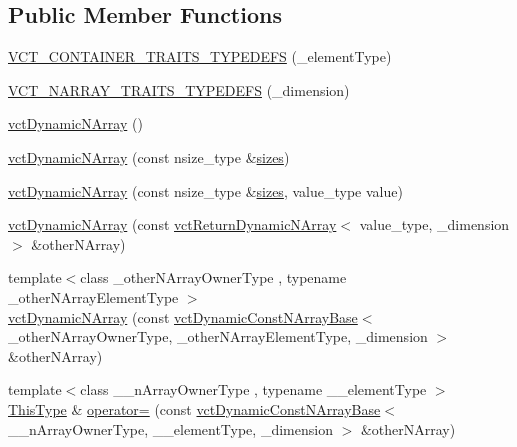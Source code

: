 \subsection*{Public Member Functions}
\begin{DoxyCompactItemize}
\item 
\hyperlink{classvct_dynamic_n_array_a4af562b1f07469aee8e1814229c25f43}{V\-C\-T\-\_\-\-C\-O\-N\-T\-A\-I\-N\-E\-R\-\_\-\-T\-R\-A\-I\-T\-S\-\_\-\-T\-Y\-P\-E\-D\-E\-F\-S} (\-\_\-element\-Type)
\item 
\hyperlink{classvct_dynamic_n_array_a8b81b0f17ae6ab1003db3caec7975a69}{V\-C\-T\-\_\-\-N\-A\-R\-R\-A\-Y\-\_\-\-T\-R\-A\-I\-T\-S\-\_\-\-T\-Y\-P\-E\-D\-E\-F\-S} (\-\_\-dimension)
\item 
\hyperlink{classvct_dynamic_n_array_a060ec7a5353aa03ec193408550e4db87}{vct\-Dynamic\-N\-Array} ()
\item 
\hyperlink{classvct_dynamic_n_array_aafd77c7531ef00396fdfb20405fc4661}{vct\-Dynamic\-N\-Array} (const nsize\-\_\-type \&\hyperlink{classvct_dynamic_const_n_array_base_aa86793343d80325ba5671bc24a2e0e8f}{sizes})
\item 
\hyperlink{classvct_dynamic_n_array_a3434a9ecc21191540f8a7e97c3bb1583}{vct\-Dynamic\-N\-Array} (const nsize\-\_\-type \&\hyperlink{classvct_dynamic_const_n_array_base_aa86793343d80325ba5671bc24a2e0e8f}{sizes}, value\-\_\-type value)
\item 
\hyperlink{classvct_dynamic_n_array_ad75002957a8c3602e333ba455f4676a5}{vct\-Dynamic\-N\-Array} (const \hyperlink{classvct_return_dynamic_n_array}{vct\-Return\-Dynamic\-N\-Array}$<$ value\-\_\-type, \-\_\-dimension $>$ \&other\-N\-Array)
\item 
{\footnotesize template$<$class \-\_\-other\-N\-Array\-Owner\-Type , typename \-\_\-other\-N\-Array\-Element\-Type $>$ }\\\hyperlink{classvct_dynamic_n_array_a87edcc1f96efe22934bdfa855aecebdb}{vct\-Dynamic\-N\-Array} (const \hyperlink{classvct_dynamic_const_n_array_base}{vct\-Dynamic\-Const\-N\-Array\-Base}$<$ \-\_\-other\-N\-Array\-Owner\-Type, \-\_\-other\-N\-Array\-Element\-Type, \-\_\-dimension $>$ \&other\-N\-Array)
\item 
{\footnotesize template$<$class \-\_\-\-\_\-n\-Array\-Owner\-Type , typename \-\_\-\-\_\-element\-Type $>$ }\\\hyperlink{classvct_dynamic_const_n_array_base_a5123caffcf1455a1b99003877eade897}{This\-Type} \& \hyperlink{classvct_dynamic_n_array_a6ae75d83b809f96fde255855bcc34919}{operator=} (const \hyperlink{classvct_dynamic_const_n_array_base}{vct\-Dynamic\-Const\-N\-Array\-Base}$<$ \-\_\-\-\_\-n\-Array\-Owner\-Type, \-\_\-\-\_\-element\-Type, \-\_\-dimension $>$ \&other\-N\-Array)

\end{DoxyCompactItemize}
